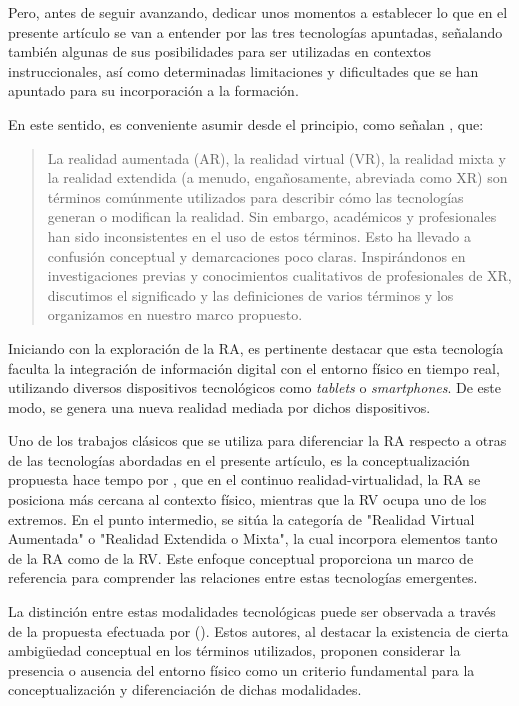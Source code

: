 \documentclass[spanish]{textolivre}
\begin{document}
Pero, antes de seguir avanzando, dedicar unos momentos a establecer lo que en el presente artículo se van a entender por las tres tecnologías apuntadas, señalando también algunas de sus posibilidades para ser utilizadas en contextos instruccionales, así como determinadas limitaciones y dificultades que se han apuntado para su incorporación a la formación. 

En este sentido, es conveniente asumir desde el principio, como señalan \textcite[p.~1]{rauschnabel2022xr}, que: 

\begin{quote}
La realidad aumentada (AR), la realidad virtual (VR), la realidad mixta y la realidad extendida (a menudo, engañosamente, abreviada como XR) son términos comúnmente utilizados para describir cómo las tecnologías generan o modifican la realidad. Sin embargo, académicos y profesionales han sido inconsistentes en el uso de estos términos. Esto ha llevado a confusión conceptual y demarcaciones poco claras. Inspirándonos en investigaciones previas y conocimientos cualitativos de profesionales de XR, discutimos el significado y las definiciones de varios términos y los organizamos en nuestro marco propuesto.
\end{quote}


Iniciando con la exploración de la RA, es pertinente destacar que esta tecnología faculta la integración de información digital con el entorno físico en tiempo real, utilizando diversos dispositivos tecnológicos como \textit{tablets} o \textit{smartphones}. De este modo, se genera una nueva realidad mediada por dichos dispositivos.

Uno de los trabajos clásicos que se utiliza para diferenciar la RA respecto a otras de las tecnologías abordadas en el presente artículo, es la conceptualización propuesta hace tempo por \textcite{milgram1994taxonomy}, que en el continuo realidad-virtualidad, la RA se posiciona más cercana al contexto físico, mientras que la RV ocupa uno de los extremos. En el punto intermedio, se sitúa la categoría de "Realidad Virtual Aumentada" o "Realidad Extendida o Mixta", la cual incorpora elementos tanto de la RA como de la RV. Este enfoque conceptual proporciona un marco de referencia para comprender las relaciones entre estas tecnologías emergentes.

La distinción entre estas modalidades tecnológicas puede ser observada a través de la propuesta efectuada por \textcite{rauschnabel2022xr} (). Estos autores, al destacar la existencia de cierta ambigüedad conceptual en los términos utilizados, proponen considerar la presencia o ausencia del entorno físico como un criterio fundamental para la conceptualización y diferenciación de dichas modalidades.
\end{document}
